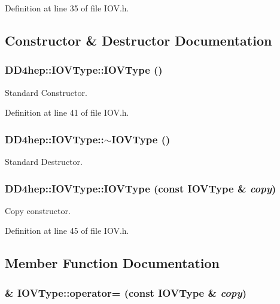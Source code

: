 Definition at line 35 of file IOV.h.

\subsection{Constructor \& Destructor Documentation}
\hypertarget{class_d_d4hep_1_1_i_o_v_type_aa45116fda61d8214bcf0f83dcac1e9f6}{
\subsubsection[{IOVType}]{\setlength{\rightskip}{0pt plus 5cm}DD4hep::IOVType::IOVType ()}}
\label{class_d_d4hep_1_1_i_o_v_type_aa45116fda61d8214bcf0f83dcac1e9f6}


Standard Constructor. 

Definition at line 41 of file IOV.h.\hypertarget{class_d_d4hep_1_1_i_o_v_type_a2ae28974fb8464c5e34b158e92efb728}{
\subsubsection[{$\sim$IOVType}]{\setlength{\rightskip}{0pt plus 5cm}DD4hep::IOVType::$\sim$IOVType ()}}
\label{class_d_d4hep_1_1_i_o_v_type_a2ae28974fb8464c5e34b158e92efb728}


Standard Destructor. \hypertarget{class_d_d4hep_1_1_i_o_v_type_a89eb725303b66a7a2a3b2198f96a4913}{
\subsubsection[{IOVType}]{\setlength{\rightskip}{0pt plus 5cm}DD4hep::IOVType::IOVType (const {\bf IOVType} \& {\em copy})}}
\label{class_d_d4hep_1_1_i_o_v_type_a89eb725303b66a7a2a3b2198f96a4913}


Copy constructor. 

Definition at line 45 of file IOV.h.

\subsection{Member Function Documentation}
\hypertarget{class_d_d4hep_1_1_i_o_v_type_a7c7f28fc3cd9f5f32ba33cdd5c12a43a}{
\subsubsection[{operator=}]{ \& IOVType::operator= (const {\bf IOVType} \& {\em copy})}}
\label{class_d_d4hep_1_1_i_o_v_type_a7c7f28fc3cd9f5f32ba33cdd5c12a43a}


